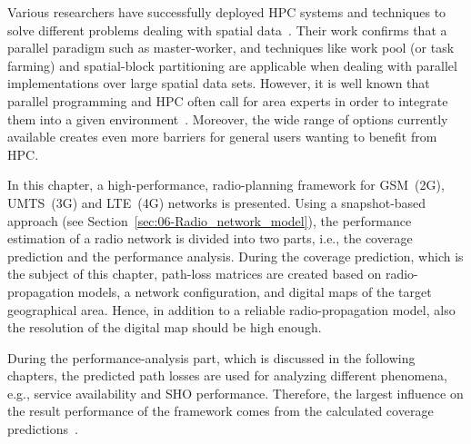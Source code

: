 Various researchers have successfully deployed HPC systems and techniques
to solve different problems dealing with spatial data~\cite{Akhter_Porting_GRASS_raster_module_to_distributed_computing:2007,Armstrong_Using_a_computational_grid_for_geographic_information_analysis:2005,Guan_A_parallel_computing_approach_to_fast_geostatistical_areal_interpolation:2011,Huang_Using_adaptively_coupled_models_and_high_performance_computing_for_enabling_the_computability_of_dust_storm_forecasting:2012,Li_Parallel_cellular_automata_for_large_scale_urban_simulation_using_load_balancing_techniques:2010,Osterman_CUDA_on_GRASS:2012,Tabik-High_performance_three_horizon_composition_algorithm_for_large_scale_terrains:2011,Tabik-Optimal_tilt_and_orientation_maps_a_multi_algorithm_approach_for_heterogeneous_multicore_GPU_systems:2013,Tabik_Simultaneous_computation_of_total_viewshed_on_large_high_resolution_grids:2012,Widener_Developing_a_parallel_computational_implementation_of_AMOEBA:2012,Yin_A_framework_for_integrating_GIS_and_parallel_computing_for_spatial_control_problems_a_case_study_of_wildfire_dontrol:2012}.
Their work confirms that a parallel paradigm such as master-worker,
and techniques like work pool (or task farming) and spatial-block
partitioning are applicable when dealing with parallel implementations
over large spatial data sets. However, it is well known that parallel
programming and HPC often call for area experts in order to integrate
them into a given environment~\cite{Clematis_High_performance_computing_with_geographical_data:2003}.
Moreover, the wide range of options currently available creates even
more barriers for general users wanting to benefit from HPC.

\bigskip{}


In this chapter, a high-performance, radio-planning framework for
GSM~(2G), UMTS~(3G) and LTE~(4G) networks is presented. Using a
snapshot-based approach (see Section~\ref{sec:06-Radio_network_model}),
the performance estimation of a radio network is divided into two
parts, i.e., the coverage prediction and the performance analysis.
During the coverage prediction, which is the subject of this chapter,
path-loss matrices are created based on radio-propagation models,
a network configuration, and digital maps of the target geographical
area. Hence, in addition to a reliable radio-propagation model, also
the resolution of the digital map should be high enough.

During the performance-analysis part, which is discussed in the following
chapters, the predicted path losses are used for analyzing different
phenomena, e.g., service availability and SHO performance. Therefore,
the largest influence on the result performance of the framework comes
from the calculated coverage predictions~\cite{Coinchon-The_impact_of_radio_propagation_predictions:2020}.

